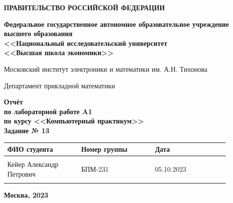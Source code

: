 \documentclass[12pt]{article}
\begin{document}
	
	\thispagestyle{empty}
	\begin{center}
		\textbf{ПРАВИТЕЛЬСТВО РОССИЙСКОЙ ФЕДЕРАЦИИ}
		
		\vspace{5ex}
		
		\textbf{Федеральное государственное автономное образовательное учреждение \\ высшего образования \\ <<Национальный исследовательский университет \\ <<Высшая школа экономики>>}
	\end{center}
	\vspace{5ex}
	
	\begin{center}
		Московский институт электроники и математики им. А.Н. Тихонова  
		
		\vspace{5ex}
		
		Департамент прикладной математики
		
		\vspace{10ex}
		\textbf{Отчёт \\ по лабораторной работе A1 \\ по курсу <<Компьютерный практикум>> \\ Задание № 13}
		\vspace{7ex}
		
	\end{center}
	
	\begin{center} 
		\begin{tabular}{| p{0.3\linewidth}| p{0.3\linewidth}| p{0.3\linewidth}|}
			\hline	
			ФИО студента & Номер группы & Дата \\  \hline
			& & \\  
			Кейер Александр \newline Петрович & БПМ-231 & 05.10.2023\\  
			& & \\  \hline		
		\end{tabular}
	\end{center}
	
	\begin{center}
		\vspace{3ex}
		
		\vfill
		
		\normalsize
		
		\textbf{Москва, 2023}
	\end{center}
	
	\newpage
	
\end{document}
